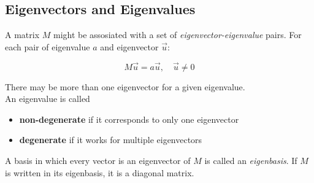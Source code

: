 \documentclass{article}
\begin{document}
\subsection{Eigenvectors and Eigenvalues}

A matrix \(M\) might be assosiated with a set of \textit{eigenvector-eigenvalue} pairs.
For each pair of eigenvalue \(a\) and eigenvector \(\vec{u}\):

\[
    M\vec{u}=a\vec{u},
    \quad\vec{u}\neq 0
\]

There may be more than one eigenvector for a given eigenvalue. \\
An eigenvalue is called
\begin{itemize}
    \item \textbf{non-degenerate} if it corresponds to only one eigenvector
    \item \textbf{degenerate} if it works for multiple eigenvectors
\end{itemize}

A basis in which every vector is an eigenvector of \(M\) is called an \textit{eigenbasis}.
If \(M\) is written in its eigenbasis, it is a diagonal matrix.


\pagebreak

\nocite{*} %

\printbibliography
\end{document}
